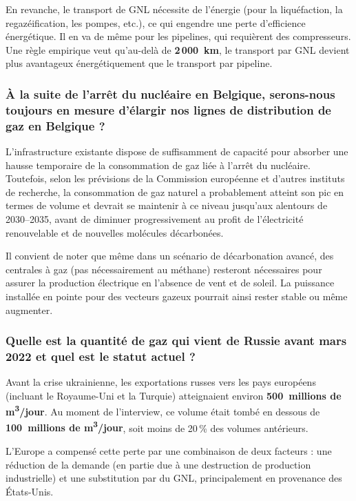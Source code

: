 En revanche, le transport de GNL nécessite de l'énergie (pour la liquéfaction, la regazéification, les pompes, etc.), ce qui engendre une perte d'efficience énergétique. Il en va de même pour les pipelines, qui requièrent des compresseurs. Une règle empirique veut qu'au-delà de \textbf{2\,000~km}, le transport par GNL devient plus avantageux énergétiquement que le transport par pipeline.

\subsubsection{À la suite de l'arrêt du nucléaire en Belgique, serons-nous toujours en mesure d'élargir nos lignes de distribution de gaz en Belgique ?}

L'infrastructure existante dispose de suffisamment de capacité pour absorber une hausse temporaire de la consommation de gaz liée à l'arrêt du nucléaire. Toutefois, selon les prévisions de la Commission européenne et d'autres instituts de recherche, la consommation de gaz naturel a probablement atteint son pic en termes de volume et devrait se maintenir à ce niveau jusqu'aux alentours de 2030--2035, avant de diminuer progressivement au profit de l'électricité renouvelable et de nouvelles molécules décarbonées.

Il convient de noter que même dans un scénario de décarbonation avancé, des centrales à gaz (pas nécessairement au méthane) resteront nécessaires pour assurer la production électrique en l'absence de vent et de soleil. La puissance installée en pointe pour des vecteurs gazeux pourrait ainsi rester stable ou même augmenter.

\subsubsection{Quelle est la quantité de gaz qui vient de Russie avant mars 2022 et quel est le statut actuel ?}

Avant la crise ukrainienne, les exportations russes vers les pays européens (incluant le Royaume-Uni et la Turquie) atteignaient environ \textbf{500~millions de m\textsuperscript{3}/jour}. Au moment de l'interview, ce volume était tombé en dessous de \textbf{100~millions de m\textsuperscript{3}/jour}, soit moins de 20\,\% des volumes antérieurs.

L'Europe a compensé cette perte par une combinaison de deux facteurs : une réduction de la demande (en partie due à une destruction de production industrielle) et une substitution par du GNL, principalement en provenance des États-Unis.

